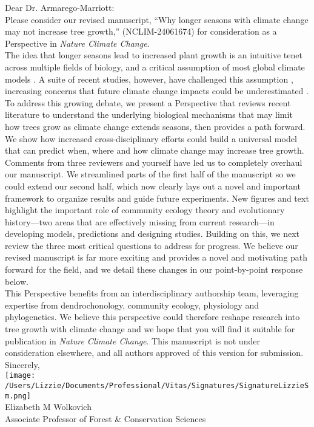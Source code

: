 \documentclass[11pt,a4paper]{article}
\begin{document}
\noindent Dear Dr. Armarego-Marriott:
\vspace{1.5ex}\\
Please consider our revised manuscript, ``Why longer seasons with climate change may not increase tree growth,'' (NCLIM-24061674) for consideration as a Perspective in \emph{Nature Climate Change}. 
\vspace{1.5ex}\\
The idea that longer seasons lead to increased plant growth is an intuitive tenet across multiple fields of biology, and a critical assumption of most global climate models \citep{friedlingstein2022global}. A suite of recent studies, however, have challenged this assumption \citep[e.g.][]{dow2022warm,green2022limits}, increasing concerns that future climate change impacts could be underestimated \citep{green2022limits,korner2023four}. 
\vspace{1.5ex}\\
To address this growing debate, we present a Perspective that reviews recent literature to understand the underlying biological mechanisms that may limit how trees grow as climate change extends seasons, then provides a path forward.  We show how increased cross-disciplinary efforts could build a universal model that can predict when, where and how climate change may increase tree growth. 
\vspace{1.5ex}\\
Comments from three reviewers and yourself have led us to completely overhaul our manuscript. We streamlined parts of the first half of the manuscript so we could extend our second half, which now clearly lays out a novel and important framework to organize results and guide future experiments. New figures and text highlight the important role of community ecology theory and evolutionary history---two areas that are effectively missing from current research---in developing models, predictions and designing studies. Building on this, we next review the three most critical questions to address for progress. We believe our revised manuscript is far more exciting and provides a novel and motivating path forward for the field, and we detail these changes in our point-by-point response below. 
\vspace{1.5ex}\\
This Perspective benefits from an interdisciplinary authorship team, leveraging expertise from dendrochonology, community ecology, physiology and phylogenetics. We believe this perspective could therefore reshape research into tree growth with climate change and we hope that you will find it suitable for publication in \emph{Nature Climate Change}. This manuscript is not under consideration elsewhere, and all authors approved of this version for submission. 
\vspace{1.5ex}\\
Sincerely,\\

\texttt{[image: /Users/Lizzie/Documents/Professional/Vitas/Signatures/SignatureLizzieSm.png]} \\

\noindent Elizabeth M Wolkovich\\
Associate Professor of Forest \& Conservation Sciences\\ 


\newpage

\end{document}
